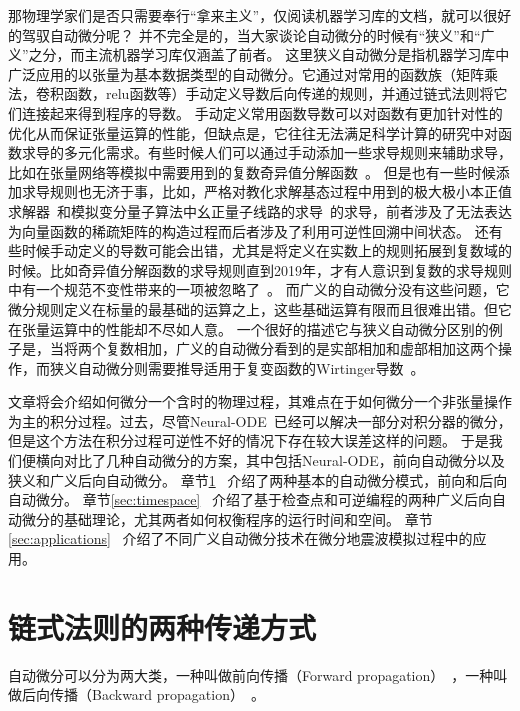 \documentclass[A4,twoside,fontset=ubuntu,UTF8]{ctexart}
\begin{document}
那物理学家们是否只需要奉行“拿来主义”，仅阅读机器学习库的文档，就可以很好的驾驭自动微分呢？
并不完全是的，当大家谈论自动微分的时候有“狭义”和“广义”之分，而主流机器学习库仅涵盖了前者。
这里狭义自动微分是指机器学习库中广泛应用的以张量为基本数据类型的自动微分。它通过对常用的函数族（矩阵乘法，卷积函数，relu函数等）手动定义导数后向传递的规则，并通过链式法则将它们连接起来得到程序的导数。
手动定义常用函数导数可以对函数有更加针对性的优化从而保证张量运算的性能，但缺点是，它往往无法满足科学计算的研究中对函数求导的多元化需求。有些时候人们可以通过手动添加一些求导规则来辅助求导，比如在张量网络等模拟中需要用到的复数奇异值分解函数~\cite{Wan2019,Liao2019}。
但是也有一些时候添加求导规则也无济于事，比如，严格对教化求解基态过程中用到的极大极小本正值求解器~\cite{Xie2020}和模拟变分量子算法中幺正量子线路的求导~\cite{Luo2019}的求导，前者涉及了无法表达为向量函数的稀疏矩阵的构造过程而后者涉及了利用可逆性回溯中间状态。
还有些时候手动定义的导数可能会出错，尤其是将定义在实数上的规则拓展到复数域的时候。比如奇异值分解函数的求导规则直到2019年，才有人意识到复数的求导规则中有一个规范不变性带来的一项被忽略了~\cite{Wan2019}。
而广义的自动微分没有这些问题，它微分规则定义在标量的最基础的运算之上，这些基础运算有限而且很难出错。但它在张量运算中的性能却不尽如人意。
一个很好的描述它与狭义自动微分区别的例子是，当将两个复数相加，广义的自动微分看到的是实部相加和虚部相加这两个操作，而狭义自动微分则需要推导适用于复变函数的Wirtinger导数~\cite{Hirose2003}。

    文章将会介绍如何微分一个含时的物理过程，其难点在于如何微分一个非张量操作为主的积分过程。过去，尽管Neural-ODE~\cite{Chen2018}已经可以解决一部分对积分器的微分，但是这个方法在积分过程可逆性不好的情况下存在较大误差这样的问题。
于是我们便横向对比了几种自动微分的方案，其中包括Neural-ODE，前向自动微分以及狭义和广义后向自动微分。
章节\ref{sec:forwardbackward}~ 介绍了两种基本的自动微分模式，前向和后向自动微分。
章节\ref{sec:timespace}~ 介绍了基于检查点和可逆编程的两种广义后向自动微分的基础理论，尤其两者如何权衡程序的运行时间和空间。
章节\ref{sec:applications}~ 介绍了不同广义自动微分技术在微分地震波模拟过程中的应用。

\section{链式法则的两种传递方式}\label{sec:forwardbackward}

    自动微分可以分为两大类，一种叫做前向传播（Forward propagation）~\cite{Wengert1964}，一种叫做后向传播（Backward propagation）~\cite{Boltyanski1960}。
\end{document}

